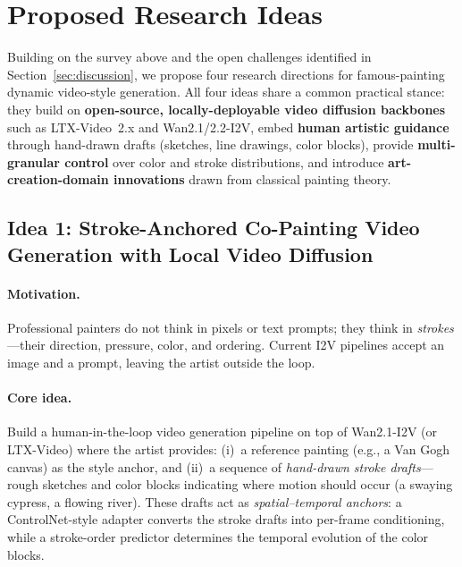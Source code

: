 \section{Proposed Research Ideas}
\label{sec:ideas}

Building on the survey above and the open challenges identified in
Section~\ref{sec:discussion}, we propose four research directions for famous-painting
dynamic video-style generation. All four ideas share a common practical stance: they
build on \textbf{open-source, locally-deployable video diffusion backbones} such as
LTX-Video~2.x and Wan2.1/2.2-I2V, embed \textbf{human artistic guidance} through
hand-drawn drafts (sketches, line drawings, color blocks), provide \textbf{multi-granular
control} over color and stroke distributions, and introduce \textbf{art-creation-domain
innovations} drawn from classical painting theory.

\subsection{Idea 1: Stroke-Anchored Co-Painting Video Generation with Local Video Diffusion}
\label{sec:idea1}

\paragraph{Motivation.} Professional painters do not think in pixels or text prompts;
they think in \emph{strokes}---their direction, pressure, color, and ordering. Current
I2V pipelines accept an image and a prompt, leaving the artist outside the loop.

\paragraph{Core idea.} Build a human-in-the-loop video generation pipeline on top of
Wan2.1-I2V (or LTX-Video) where the artist provides:
(i)~a reference painting (e.g., a Van Gogh canvas) as the style anchor, and
(ii)~a sequence of \emph{hand-drawn stroke drafts}---rough sketches and color blocks
indicating where motion should occur (a swaying cypress, a flowing river). These drafts
act as \emph{spatial--temporal anchors}: a ControlNet-style adapter converts the
stroke drafts into per-frame conditioning, while a stroke-order predictor determines the
temporal evolution of the color blocks.

